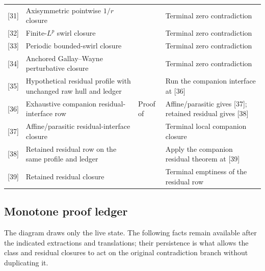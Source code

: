 \documentclass[11pt]{amsart}
\theoremstyle{plain}
\theoremstyle{definition}
\theoremstyle{remark}
\numberwithin{equation}{section}
\begin{document}
\begin{landscape}
\begin{longtable}{@{}C{0.72cm}L{4.55cm}L{7.25cm}L{6.05cm}@{}}
[31] & Axisymmetric pointwise \(1/r\) closure &
 & Terminal zero contradiction \\

[32] & Finite-\(L^p\) swirl closure &
 & Terminal zero contradiction \\

[33] & Periodic bounded-swirl closure &
 & Terminal zero contradiction \\

[34] & Anchored Gallay--Wayne perturbative closure &
 & Terminal zero contradiction \\

[35] & Hypothetical residual profile with unchanged raw hull and ledger &
 & Run the companion interface at [36] \\

[36] & Exhaustive companion residual-interface row &
Proof of  & Affine/parasitic gives [37]; retained residual gives [38] \\

[37] & Affine/parasitic residual-interface closure &
 & Terminal local companion closure \\

[38] & Retained residual row on the same profile and ledger &
 & Apply the companion residual theorem at [39] \\

[39] & Retained residual closure &
 & Terminal emptiness of the residual row \\

\end{longtable}
\endgroup
\end{landscape}

\subsection{Monotone proof ledger}
\label{subsec:local-typeI-monotone-ledger}

The diagram draws only the live state.  The following facts remain available
after the indicated extractions and translations; their persistence is what
allows the class and residual closures to act on the original contradiction
branch without duplicating it.
\end{document}
